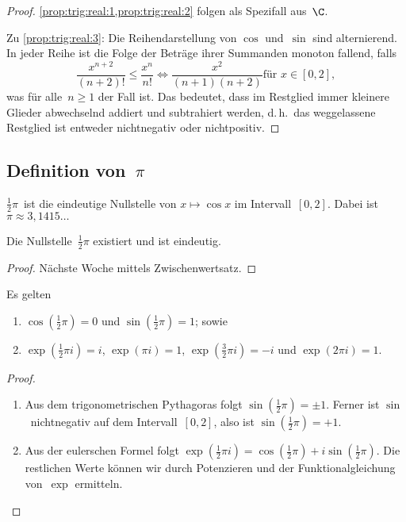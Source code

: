 \documentclass[a4paper]{article}
\begin{document}
\begin{proof}
    \cref{prop:trig:real:1,prop:trig:real:2} folgen als Spezifall aus~$\C$.

    Zu \cref{prop:trig:real:3}: Die Reihendarstellung von $\cos$ und~$\sin$ sind alternierend. In jeder Reihe ist die Folge der Beträge ihrer Summanden monoton fallend, falls
    \begin{equation*}
        \frac{x^{n+2}}{(n+2)!} \leq \frac{x^n}{n!} \iff \frac{x^2}{(n+1)(n+2)} \text{für } x \in [0, 2],
    \end{equation*}
    was für alle~$n \geq 1$ der Fall ist. Das bedeutet, dass im Restglied immer kleinere Glieder abwechselnd addiert und subtrahiert werden, d.\,h.\ das weggelassene Restglied ist entweder nichtnegativ oder nichtpositiv.
\end{proof}

\subsection{Definition von~\texorpdfstring{$\pi$}{Pi}}

\begin{definition}[Kreiszahl]
    $\frac{1}{2}\pi$~ist die eindeutige Nullstelle von $x \mapsto \cos x$ im Intervall~$[0, 2]$. Dabei ist $\pi \approx 3,1415\dots$
\end{definition}

\begin{proposition}\label{prop:pi}
    Die Nullstelle~$\frac{1}{2}\pi$ existiert und ist eindeutig.
\end{proposition}

\begin{proof}
    Nächste Woche mittels Zwischenwertsatz.
\end{proof}

\begin{proposition}\label{prop:pi:functions}
    Es gelten
    \begin{enumerate}
        \item $\cos(\frac{1}{2}\pi) = 0$ und $\sin(\frac{1}{2}\pi) = 1$; sowie
        \item $\exp(\frac{1}{2}\pi i) = i$, $\exp(\pi i) = 1$, $\exp(\frac{3}{2}\pi i) = -i$ und $\exp(2\pi i) = 1$.
    \end{enumerate}
\end{proposition}

\begin{proof}\leavevmode
    \begin{enumerate}
        \item Aus dem trigonometrischen Pythagoras folgt $\sin(\frac{1}{2}\pi) = \pm 1$. Ferner ist $\sin$~nichtnegativ auf dem Intervall~$[0, 2]$, also ist $\sin(\frac{1}{2}\pi) = +1$.
        \item Aus der eulerschen Formel folgt $\exp(\frac{1}{2}\pi i) = \cos(\frac{1}{2}\pi) + i\sin(\frac{1}{2}\pi)$. Die restlichen Werte können wir durch Potenzieren und der Funktionalgleichung von~$\exp$ ermitteln.\qedhere
    \end{enumerate}
\end{proof}
\end{document}
